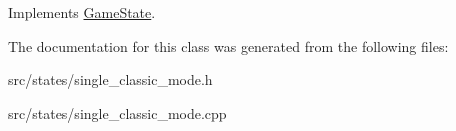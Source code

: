 Implements \hyperlink{class_game_state_ab2864bfa04f92f6966861a1f2883bda0}{Game\-State}.



The documentation for this class was generated from the following files\-:\begin{DoxyCompactItemize}
\item 
src/states/single\-\_\-classic\-\_\-mode.\-h\item 
src/states/single\-\_\-classic\-\_\-mode.\-cpp\end{DoxyCompactItemize}
